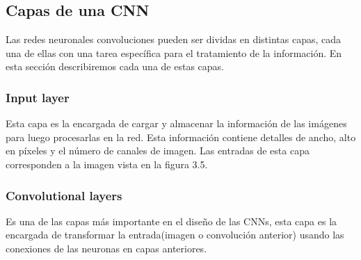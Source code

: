 \subsection{Capas de una CNN}
Las redes neuronales convoluciones pueden ser dividas en distintas capas, cada una de ellas con una tarea específica para el tratamiento de la información. En esta sección describiremos cada una de estas capas.
\subsubsection{Input layer}
Esta capa es la encargada de cargar y almacenar la información de las imágenes para luego procesarlas en la red. Esta información contiene detalles de ancho, alto en píxeles y el número de canales de imagen. Las entradas de esta capa corresponden a la imagen vista en la figura 3.5.

\subsubsection{Convolutional layers}
Es una de las capas más importante en el diseño de las CNNs, esta capa es la encargada de transformar la entrada(imagen o convolución anterior) usando las conexiones de las neuronas en capas anteriores. 

